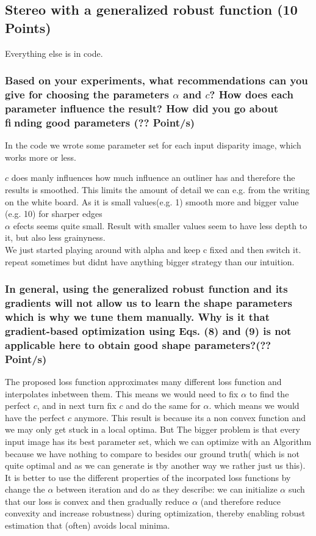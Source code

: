 \newif\ifvimbug
\vimbugfalse

\ifvimbug

\fi


\subsection{Stereo with a generalized robust function (10 Points)}
\setcounter{subsubsection}{4}
Everything else is in code.
\subsubsection{Based on your experiments, what recommendations can you give for choosing the parameters $\alpha$ and $c$? How does each parameter influence the result? How did you go about finding good parameters (?? Point/s)}
In the code we wrote some parameter set for each input disparity image, which works more or less.

$c$ does manly influences how much influence an outliner has and therefore the results is smoothed. This limits the amount of detail we can e.g. from the writing on the white board. As it is small values(e.g. 1) smooth more and bigger value (e.g. 10) for sharper edges\\
$\alpha$ efects seems quite small. Result with smaller values seem to have less depth to it, but also less grainyness.\\

We just started playing around with alpha and keep c fixed and then switch it. repeat sometimes but didnt have anything bigger strategy than our intuition.\\

\subsubsection{In general, using the generalized robust function and its gradients will not allow us to learn the shape parameters which is why we tune them manually. Why is it that gradient-based optimization using Eqs. (8) and (9) is not applicable here to obtain good shape parameters?(?? Point/s)}
The proposed loss function approximates many different loss function and interpolates inbetween them. This means we would need to fix $\alpha$ to find the perfect $c$, and in next turn fix $c$ and do the same for $\alpha$. which means we would have the perfect $c$ anymore. This result is because its a non convex function and we may only get stuck in a local optima. But The bigger problem is that every input image has its best parameter set, which we can optimize with an Algorithm because we have nothing to compare to besides our ground truth( which is not quite optimal and as we can generate is tby another way we rather just us this).\\
 It is better to use the different properties of the incorpated loss functions by change the $\alpha$ between iteration and do as they describe: we can initialize $\alpha$  such that our loss is convex and then gradually reduce $\alpha$  (and therefore reduce convexity and increase robustness) during optimization, thereby enabling robust estimation that (often) avoids local minima.\\